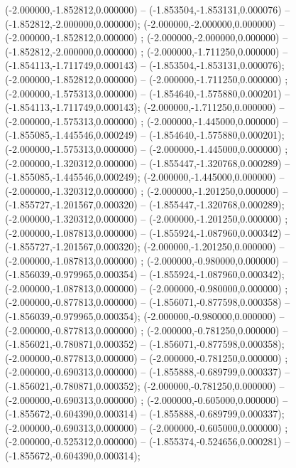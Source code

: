  (-2.000000,-1.852812,0.000000) -- (-1.853504,-1.853131,0.000076) -- (-1.852812,-2.000000,0.000000);
 (-2.000000,-2.000000,0.000000) -- (-2.000000,-1.852812,0.000000) ;
 (-2.000000,-2.000000,0.000000) -- (-1.852812,-2.000000,0.000000) ;
 (-2.000000,-1.711250,0.000000) -- (-1.854113,-1.711749,0.000143) -- (-1.853504,-1.853131,0.000076);
 (-2.000000,-1.852812,0.000000) -- (-2.000000,-1.711250,0.000000) ;
 (-2.000000,-1.575313,0.000000) -- (-1.854640,-1.575880,0.000201) -- (-1.854113,-1.711749,0.000143);
 (-2.000000,-1.711250,0.000000) -- (-2.000000,-1.575313,0.000000) ;
 (-2.000000,-1.445000,0.000000) -- (-1.855085,-1.445546,0.000249) -- (-1.854640,-1.575880,0.000201);
 (-2.000000,-1.575313,0.000000) -- (-2.000000,-1.445000,0.000000) ;
 (-2.000000,-1.320312,0.000000) -- (-1.855447,-1.320768,0.000289) -- (-1.855085,-1.445546,0.000249);
 (-2.000000,-1.445000,0.000000) -- (-2.000000,-1.320312,0.000000) ;
 (-2.000000,-1.201250,0.000000) -- (-1.855727,-1.201567,0.000320) -- (-1.855447,-1.320768,0.000289);
 (-2.000000,-1.320312,0.000000) -- (-2.000000,-1.201250,0.000000) ;
 (-2.000000,-1.087813,0.000000) -- (-1.855924,-1.087960,0.000342) -- (-1.855727,-1.201567,0.000320);
 (-2.000000,-1.201250,0.000000) -- (-2.000000,-1.087813,0.000000) ;
 (-2.000000,-0.980000,0.000000) -- (-1.856039,-0.979965,0.000354) -- (-1.855924,-1.087960,0.000342);
 (-2.000000,-1.087813,0.000000) -- (-2.000000,-0.980000,0.000000) ;
 (-2.000000,-0.877813,0.000000) -- (-1.856071,-0.877598,0.000358) -- (-1.856039,-0.979965,0.000354);
 (-2.000000,-0.980000,0.000000) -- (-2.000000,-0.877813,0.000000) ;
 (-2.000000,-0.781250,0.000000) -- (-1.856021,-0.780871,0.000352) -- (-1.856071,-0.877598,0.000358);
 (-2.000000,-0.877813,0.000000) -- (-2.000000,-0.781250,0.000000) ;
 (-2.000000,-0.690313,0.000000) -- (-1.855888,-0.689799,0.000337) -- (-1.856021,-0.780871,0.000352);
 (-2.000000,-0.781250,0.000000) -- (-2.000000,-0.690313,0.000000) ;
 (-2.000000,-0.605000,0.000000) -- (-1.855672,-0.604390,0.000314) -- (-1.855888,-0.689799,0.000337);
 (-2.000000,-0.690313,0.000000) -- (-2.000000,-0.605000,0.000000) ;
 (-2.000000,-0.525312,0.000000) -- (-1.855374,-0.524656,0.000281) -- (-1.855672,-0.604390,0.000314);
